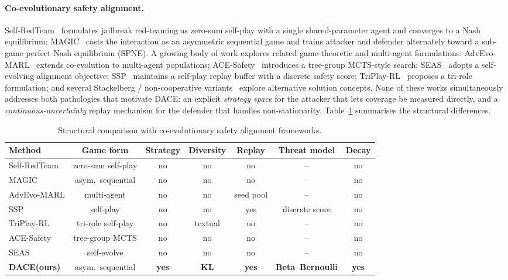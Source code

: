 \documentclass{article}
\newcommand{\method}{\textsc{DACE}\xspace}
\begin{document}
\paragraph{Co-evolutionary safety alignment.}
Self-RedTeam~\citep{liu2025chasing} formulates jailbreak red-teaming as zero-sum self-play with a single shared-parameter agent and converges to a Nash equilibrium; MAGIC~\citep{magic2025} casts the interaction as an asymmetric sequential game and trains attacker and defender alternately toward a sub-game perfect Nash equilibrium (SPNE). A growing body of work explores related game-theoretic and multi-agent formulations: AdvEvo-MARL~\citep{pan2025advevo} extends co-evolution to multi-agent populations; ACE-Safety~\citep{acesafety2025} introduces a tree-group MCTS-style search; SEAS~\citep{seas2025} adopts a self-evolving alignment objective; SSP~\citep{ssp2026} maintains a self-play replay buffer with a discrete safety score; TriPlay-RL~\citep{triplayrl2026} proposes a tri-role formulation; and several Stackelberg / non-cooperative variants~\citep{twoplayergame2024, advgame2025} explore alternative solution concepts. None of these works simultaneously addresses both pathologies that motivate \method: an explicit \emph{strategy space} for the attacker that lets coverage be measured directly, and a \emph{continuous-uncertainty} replay mechanism for the defender that handles non-stationarity. Table~\ref{tab:coevo-compare} summarises the structural differences.

\begin{table}[h]
  \centering
  \small
  \caption{Structural comparison with co-evolutionary safety alignment frameworks.}
  \label{tab:coevo-compare}
  \setlength{\tabcolsep}{3pt}
  \begin{tabular}{l c c c c c c}
    \toprule
    \textbf{Method} & \textbf{Game form} & \textbf{Strategy} & \textbf{Diversity} & \textbf{Replay} & \textbf{Threat model} & \textbf{Decay} \\
    \midrule
    Self-RedTeam & zero-sum self-play & no  & no  & no & -- & no \\
    MAGIC        & asym.\ sequential  & no  & no  & no & -- & no \\
    AdvEvo-MARL  & multi-agent        & no  & no  & seed pool & -- & no \\
    SSP          & self-play          & no  & no  & yes & discrete score & no \\
    TriPlay-RL   & tri-role self-play & no  & textual & no & -- & no \\
    ACE-Safety   & tree-group MCTS    & no  & no  & no & -- & no \\
    SEAS         & self-evolve        & no  & no  & no & -- & no \\
    \rowcolor{cyan!8}\textbf{\method (ours)} & asym.\ sequential & \textbf{yes} & \textbf{KL} & \textbf{yes} & \textbf{Beta--Bernoulli} & \textbf{yes} \\
    \bottomrule
  \end{tabular}
\end{table}
\end{document}
